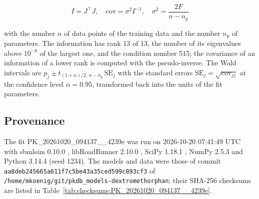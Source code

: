 \documentclass{article}
\begin{document}
\begin{equation}
I = J^\top J, \quad \mathrm{cov} = \sigma^2 I^{-1}, \quad \sigma^2 = \frac{2 F}{n - n_p}
\end{equation}

with the number $n$ of data points of the training data and the number $n_p$ of parameters. The information has rank 13 of 13, the number of its eigenvalues above $10^{-8}$ of the largest one, and the condition number 515; the covariance of an information of a lower rank is computed with the pseudo-inverse. The Wald intervals are $\hat{p}_j \pm t_{(1+\alpha)/2,\, n-n_p}\, \mathrm{SE}_j$ with the standard errors $\mathrm{SE}_j = \sqrt{\mathrm{cov}_{jj}}$ at the confidence level $\alpha = 0.95$, transformed back into the units of the fit parameters.

\subsection{Provenance}

The fit PK\_20261020\_094137\_\_4239e was run on 2026-10-20 07:41:49 UTC with sbmlsim 0.10.0 \cite{Koenig2026_sbmlsim}, libRoadRunner 2.10.0 \cite{Welsh2023}, SciPy 1.18.1 \cite{Virtanen2020}, NumPy 2.5.3 \cite{Harris2020} and Python 3.14.4 (seed 1234). The models and data were those of commit \texttt{aa8deb245665a611f7c5be43a35ced599c893cf3} of \texttt{/home/mkoenig/git/pkdb\_models-dextromethorphan}; their SHA-256 checksums are listed in Table~\ref{tab:checksums:PK_20261020_094137__4239e}.
\end{document}
